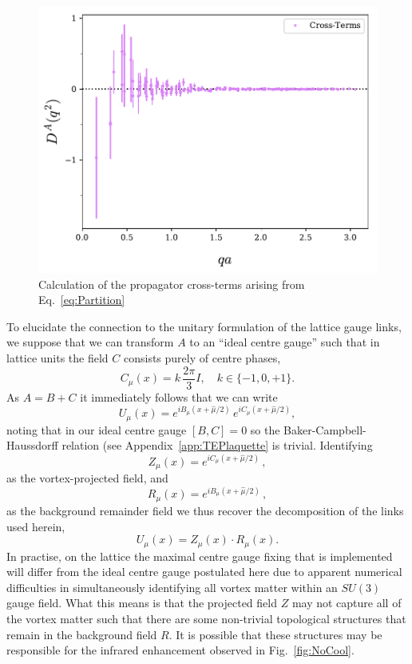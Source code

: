\begin{figure}[htb!]
\centering
\includegraphics[width=\linewidth]{./ScalarGluComp_q2_CrossTerms.pdf}
\caption[Calculation of the propagator cross-terms]{\label{fig:CrossTerms} Calculation of the propagator cross-terms arising from Eq.~\eqref{eq:Partition}}
\end{figure} 
%

To elucidate the connection to the unitary formulation of the lattice gauge links, we suppose that we can transform $A$ to an ``ideal centre gauge'' such that in lattice units the field $C$ consists purely of centre phases,
%
\begin{equation}
C_\mu(x) = k\,\frac{2\pi}{3} I,\quad k\in \{-1,0,+1\}.
\end{equation}
%
As $A = B + C$ it immediately follows that we can write
\begin{equation}
U_{\mu}(x) = e^{i B_{\mu}(x+\hat{\mu}/2)} \, e^{i C_{\mu}(x+\hat{\mu}/2)},
\end{equation}
noting that in our ideal centre gauge $[B,C] = 0$ so the Baker-Campbell-Haussdorff relation (see Appendix~\ref{app:TEPlaquette} is trivial. Identifying
\begin{equation}
Z_{\mu}(x) = e^{i C_{\mu}(x+\hat{\mu}/2)}\, ,
\end{equation}
as the vortex-projected field, and
\begin{equation}
R_{\mu}(x) = e^{i B_{\mu}(x+\hat{\mu}/2)}\, ,
\end{equation}
as the background remainder field we thus recover the decomposition of the links used herein,
\begin{equation}
U_{\mu}(x) = Z_{\mu}(x)\cdot R_{\mu}(x).
\end{equation}
In practise, on the lattice the maximal centre gauge fixing that is implemented will differ from the ideal centre gauge postulated here due to apparent numerical difficulties in simultaneously identifying all vortex matter within an $SU(3)$ gauge field. What this means is that the projected field $Z$ may not capture all of the vortex matter such that there are some non-trivial topological structures that remain in the background field $R$. It is possible that these structures may be responsible for the infrared enhancement observed in Fig.~\ref{fig:NoCool}.

